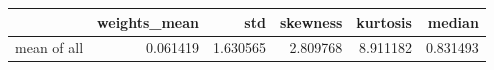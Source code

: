 \begin{tabular}{lrrrrr}
\toprule
 & weights_mean & std & skewness & kurtosis & median \\
\midrule
mean of all & 0.061419 & 1.630565 & 2.809768 & 8.911182 & 0.831493 \\
\bottomrule
\end{tabular}
